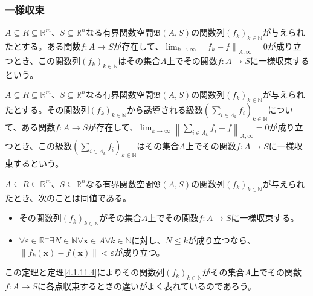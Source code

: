 \documentclass[dvipdfmx]{jsarticle}
\begin{document}
\subsubsection{一様収束}%
\begin{dfn}
$A \subseteq R \subseteq \mathbb{R}^{m}$、$S \subseteq \mathbb{R}^{n}$なる有界関数空間$\mathfrak{B}(A,S)$の関数列$\left( f_{k} \right)_{k \in \mathbb{N}}$が与えられたとする。ある関数$f:A \rightarrow S$が存在して、$\lim_{k \rightarrow \infty}\left\| f_{k} - f \right\|_{A,\infty} = 0$が成り立つとき、この関数列$\left( f_{k} \right)_{k \in \mathbb{N}}$はその集合$A$上でその関数$f:A \rightarrow S$に一様収束するという。
\end{dfn}
\begin{dfn}
$A \subseteq R \subseteq \mathbb{R}^{m}$、$S \subseteq \mathbb{R}^{n}$なる有界関数空間$\mathfrak{B}(A,S)$の関数列$\left( f_{k} \right)_{k \in \mathbb{N}}$が与えられたとする。その関数列$\left( f_{k} \right)_{k \in \mathbb{N}}$から誘導される級数$\left( \sum_{i \in \varLambda_{k}} f_{i} \right)_{k \in \mathbb{N}}$について、ある関数$f:A \rightarrow S$が存在して、$\lim_{k \rightarrow \infty}\left\| \sum_{i \in \varLambda_{k}} f_{i} - f \right\|_{A,\infty} = 0$が成り立つとき、この級数$\left( \sum_{i \in \varLambda_{k}} f_{i} \right)_{k \in \mathbb{N}}$はその集合$A$上でその関数$f:A \rightarrow S$に一様収束するという。
\end{dfn}
\begin{thm}\label{4.1.11.6}
$A \subseteq R \subseteq \mathbb{R}^{m}$、$S \subseteq \mathbb{R}^{n}$なる有界関数空間$\mathfrak{B}(A,S)$の関数列$\left( f_{k} \right)_{k \in \mathbb{N}}$が与えられたとき、次のことは同値である。
\begin{itemize}
\item
  その関数列$\left( f_{k} \right)_{k \in \mathbb{N}}$がその集合$A$上でその関数$f:A \rightarrow S$に一様収束する。
\item
  $\forall\varepsilon \in \mathbb{R}^{+}\exists N \in \mathbb{N}\forall\mathbf{x} \in A\forall k \in \mathbb{N}$に対し、$N \leq k$が成り立つなら、$\left\| f_{k}\left( \mathbf{x} \right) - f\left( \mathbf{x} \right) \right\| < \varepsilon$が成り立つ。
\end{itemize}
\end{thm}\par
この定理と定理\ref{4.1.11.4}によりその関数列$\left( f_{k} \right)_{k \in \mathbb{N}}$がその集合$A$上でその関数$f:A \rightarrow S$に各点収束するときの違いがよく表れているのであろう。
\end{document}
